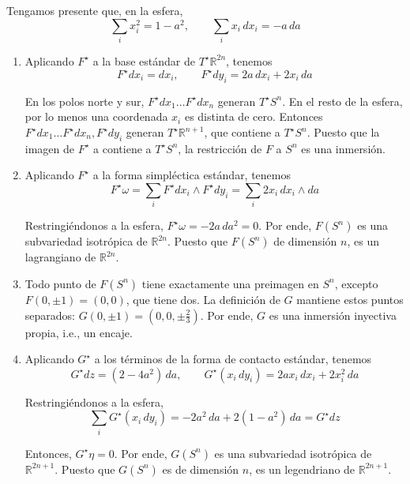\begin{solution}
Tengamos presente que, en la esfera,
$$\sum_i x_i^2 = 1 - a^2, \qquad \sum_i x_i \, dx_i = -a \, da$$

\begin{enumerate}
    \item Aplicando $F^\star$ a la base estándar de $T^\star \mathbb R^{2n}$, tenemos
    $$F^\star dx_i = dx_i, \qquad F^\star dy_i = 2a \, dx_i + 2x_i \, da$$
    
    En los polos norte y sur, $F^\star dx_1 \dots F^\star dx_n$ generan $T^\star S^n$. En el resto de la esfera, por lo menos una coordenada $x_i$ es distinta de cero. Entonces $F^\star dx_1 \dots F^\star dx_n, F^\star dy_i$ generan $T^\star \mathbb R^{n+1}$, que contiene a $T^\star S^n$. Puesto que la imagen de $F^\star$ a contiene a $T^\star S^n$, la restricción de $F$ a $S^n$ es una inmersión.
    
    \item Aplicando $F^\star$ a la forma simpléctica estándar, tenemos
    $$F^\star \omega = \sum_i F^\star dx_i \wedge F^\star dy_i = \sum_i 2x_i \, dx_i \wedge da$$
    
    Restringiéndonos a la esfera, $F^\star \omega = -2a \, da^2 = 0$. Por ende, $F(S^n)$ es una subvariedad isotrópica de $\mathbb R^{2n}$. Puesto que $F(S^n)$ de dimensión $n$, es un lagrangiano de $\mathbb R^{2n}$.
    
    \item Todo punto de $F(S^n)$ tiene exactamente una preimagen en $S^n$, excepto $F(0, \pm 1) = (0, 0)$, que tiene dos. La definición de $G$ mantiene estos puntos separados: $G(0, \pm 1) = (0, 0, \pm \tfrac 23)$. Por ende, $G$ es una inmersión inyectiva propia, i.e., un encaje.
    
    \item Aplicando $G^\star$ a los términos de la forma de contacto estándar, tenemos
    $$G^\star dz = (2 - 4a^2) \, da, \qquad G^\star (x_i \, dy_i) = 2ax_i \, dx_i + 2x_i^2 \, da$$
    
    Restringiéndonos a la esfera,
    $$\sum_i G^\star (x_i \, dy_i) = -2a^2 \, da + 2(1 - a^2) \, da = G^\star dz$$
    
    Entonces, $G^\star \eta = 0$. Por ende, $G(S^n)$ es una subvariedad isotrópica de $\mathbb R^{2n+1}$. Puesto que $G(S^n)$ es de dimensión $n$, es un legendriano de $\mathbb R^{2n+1}$.
\end{enumerate}
\end{solution}
